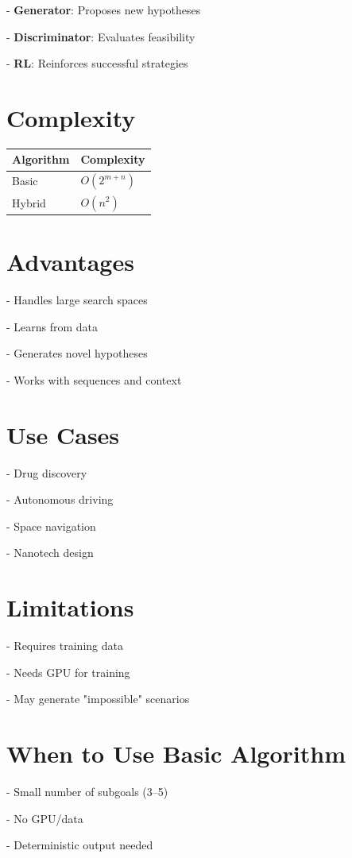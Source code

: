 \documentclass{article}
\begin{document}
    
- \textbf{Generator}: Proposes new hypotheses
    
- \textbf{Discriminator}: Evaluates feasibility
    
- \textbf{RL}: Reinforces successful strategies


\section*{Complexity}
\begin{tabular}{|l|l|}
\hline
Algorithm & Complexity \\
\hline
Basic & $ O(2^{m+n}) $ \\
Hybrid & $ O(n^2) $ \\
\hline
\end{tabular}

\section*{Advantages}

    
- Handles large search spaces
    
- Learns from data
    
- Generates novel hypotheses
    
- Works with sequences and context


\section*{Use Cases}

    
- Drug discovery
    
- Autonomous driving
    
- Space navigation
    
- Nanotech design


\section*{Limitations}

    
- Requires training data
    
- Needs GPU for training
    
- May generate "impossible" scenarios


\section*{When to Use Basic Algorithm}

    
- Small number of subgoals (3–5)
    
- No GPU/data
    
- Deterministic output needed
\end{document}
